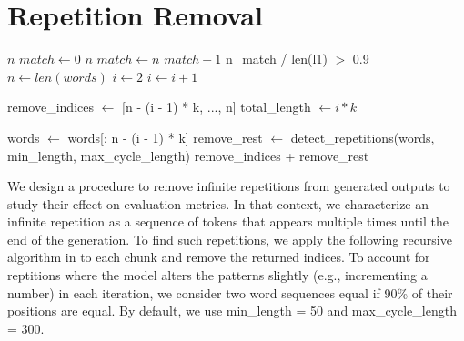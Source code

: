 \FloatBarrier
\clearpage
\section{Repetition Removal}\label{sec:rep_removal}
\FloatBarrier

\begin{algorithm*}[ht!]
  \small
  \caption{Repetition Detection}
  \label{alg:rep_removal}
  \begin{algorithmic}[1]
      \State $n\_match \gets 0$
          \State $n\_match \gets n\_match + 1$
        \EndIf
      \EndFor
      \State \Return n\_match / len(l1) $>$ 0.9
    \EndFunction
    \\
        \State $n \gets len(words)$
             
                \State $i \gets 2$ 
                 
                    \State $i \gets i + 1$
                \EndWhile
                
                \State remove\_indices $\gets$ [n - (i - 1) * k, ..., n]
                \State total\_length $\gets i * k$

                    \State words $\gets$ words[: n - (i - 1) * k]  
                    \State remove\_rest $\gets$ detect\_repetitions(words, min\_length, max\_cycle\_length) 
                    \State \Return remove\_indices + remove\_rest 
                \EndIf
            \EndIf
        \EndFor
        \State \Return []
    \EndFunction
  \end{algorithmic}
\end{algorithm*}
\FloatBarrier
We design a procedure to remove infinite repetitions from generated outputs to study their effect on evaluation metrics.  
In that context, we characterize an infinite repetition as a sequence of tokens that appears multiple times until the end of the generation.  
To find such repetitions, we apply the following recursive algorithm in  to each chunk and remove the returned indices.
To account for reptitions where the model alters the patterns slightly (e.g., incrementing a number) in each iteration, we consider two word sequences equal if 90\% of their positions are equal.
By default, we use min\_length = 50 and max\_cycle\_length = 300. 

